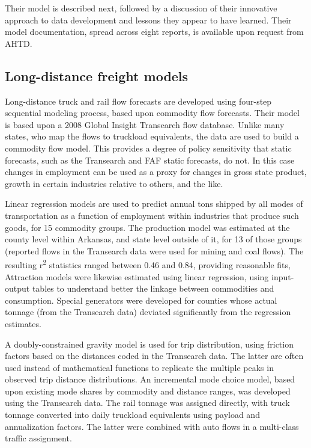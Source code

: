 Their model is described next, followed by a discussion of their innovative approach to data development and lessons they appear to have learned. Their model documentation, spread across eight reports, is available upon request from AHTD.

\subsection{Long-distance freight models}

Long-distance truck and rail flow forecasts are developed using four-step sequential modeling process, based upon commodity flow forecasts. Their model is based upon a 2008 Global Insight Transearch flow database. Unlike many states, who map the flows to truckload equivalents, the data are used to build a commodity flow model. This provides a degree of policy sensitivity that static forecasts, such as the Transearch and FAF static forecasts, do not. In this case changes in employment can be used as a proxy for changes in gross state product, growth in certain industries relative to others, and the like.

Linear regression models are used to predict annual tons shipped by all modes of transportation as a function of employment within industries that produce such goods, for 15 commodity groups. The production model was estimated at the county level within Arkansas, and state level outside of it, for 13 of those groups (reported flows in the Transearch data were used for mining and coal flows). The resulting r\textsuperscript{2} statistics ranged between 0.46 and 0.84, providing reasonable fits, Attraction models were likewise estimated using linear regression, using input-output tables to understand better the linkage between commodities and consumption. Special generators were developed for counties whose actual tonnage (from the Transearch data) deviated significantly from the regression estimates.

A doubly-constrained gravity model is used for trip distribution, using friction factors based on the distances coded in the Transearch data. The latter are often used instead of mathematical functions to replicate the multiple peaks in observed trip distance distributions. An incremental mode choice model, based upon existing mode shares by commodity and distance ranges, was developed using the Transearch data. The rail tonnage was assigned directly, with truck tonnage converted into daily truckload equivalents using payload and annualization factors. The latter were combined with auto flows in a multi-class traffic assignment.

